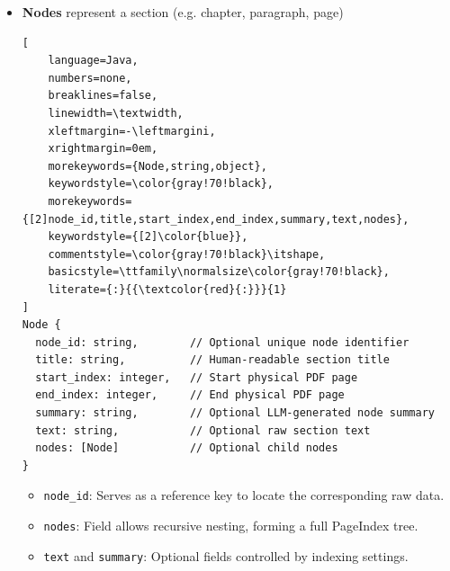 \documentclass[11pt,a4paper]{article}
\newcommand{\fieldname}[1]{\textcolor{red!70!black}{\texttt{#1}}}
\newcommand{\notesquare}{\textcolor{gray!70!black}{\rule{0.45em}{0.45em}}}
\begin{document}
\begin{itemize}
    \item \textbf{Nodes} represent a section (e.g. chapter, paragraph, page)
\begin{lstlisting}[
    language=Java,
    numbers=none,
    breaklines=false,
    linewidth=\textwidth,
    xleftmargin=-\leftmargini,
    xrightmargin=0em,
    morekeywords={Node,string,object},
    keywordstyle=\color{gray!70!black},
    morekeywords={[2]node_id,title,start_index,end_index,summary,text,nodes},
    keywordstyle={[2]\color{blue}},
    commentstyle=\color{gray!70!black}\itshape,
    basicstyle=\ttfamily\normalsize\color{gray!70!black},
    literate={:}{{\textcolor{red}{:}}}{1}
]
Node {
  node_id: string,        // Optional unique node identifier
  title: string,          // Human-readable section title
  start_index: integer,   // Start physical PDF page
  end_index: integer,     // End physical PDF page
  summary: string,        // Optional LLM-generated node summary
  text: string,           // Optional raw section text
  nodes: [Node]           // Optional child nodes
}
\end{lstlisting} 
    \begin{itemize}[label=\notesquare]
        \item \fieldname{node\_id}: Serves as a reference key to locate the corresponding raw data.
        \item \fieldname{nodes}: Field allows recursive nesting, forming a full PageIndex tree.
        \item \fieldname{text} and \fieldname{summary}: Optional fields controlled by indexing settings.
    \end{itemize}
    

\end{itemize}
\end{document}
